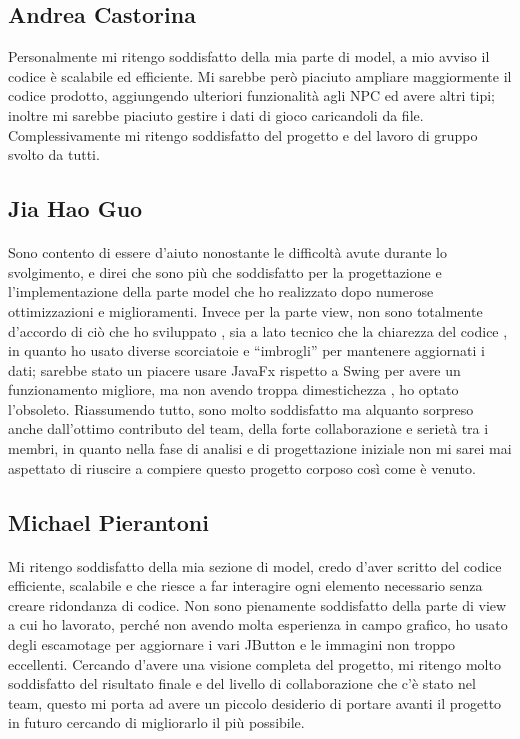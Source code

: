 
\subsection*{Andrea Castorina}
Personalmente mi ritengo soddisfatto della mia parte di model, a mio avviso il codice è scalabile ed efficiente.
Mi sarebbe però piaciuto ampliare maggiormente il codice prodotto, aggiungendo ulteriori funzionalità agli NPC ed avere altri tipi; inoltre mi sarebbe piaciuto gestire i dati di gioco caricandoli da file.
Complessivamente mi ritengo soddisfatto del progetto e del lavoro di gruppo svolto da tutti.

\subsection*{Jia Hao Guo}
\paragraph{}
Sono contento di essere d’aiuto nonostante le difficoltà avute durante lo svolgimento, e direi che sono più che soddisfatto per la progettazione e l'implementazione della parte model che ho realizzato dopo numerose ottimizzazioni e miglioramenti.
\newline
Invece per la parte view, non sono totalmente d'accordo di ciò che ho sviluppato , sia a lato tecnico che la chiarezza del codice , in quanto ho usato diverse scorciatoie e “imbrogli” per mantenere aggiornati i dati; sarebbe stato un piacere usare JavaFx rispetto a Swing per avere un funzionamento migliore, ma non avendo troppa dimestichezza , ho optato l'obsoleto.
\newline
Riassumendo tutto, sono molto soddisfatto ma alquanto sorpreso anche dall’ottimo contributo del team, della forte collaborazione e serietà tra i membri, in quanto nella fase di analisi e di progettazione iniziale non mi sarei mai aspettato di riuscire a compiere questo progetto corposo così come è venuto.


\subsection*{Michael Pierantoni}
\paragraph{}
Mi ritengo soddisfatto della mia sezione di model, credo d'aver scritto del codice efficiente, scalabile e che riesce a far interagire ogni elemento necessario senza creare ridondanza di codice.
Non sono pienamente soddisfatto della parte di view a cui ho lavorato, perché non avendo molta esperienza in campo grafico, ho usato degli escamotage per aggiornare i vari JButton e le immagini non troppo eccellenti.
Cercando d'avere una visione completa del progetto, mi ritengo molto soddisfatto del risultato finale e del livello di collaborazione che c'è stato nel team, questo mi porta ad avere un piccolo desiderio di portare avanti il progetto in futuro cercando di migliorarlo il più possibile. 